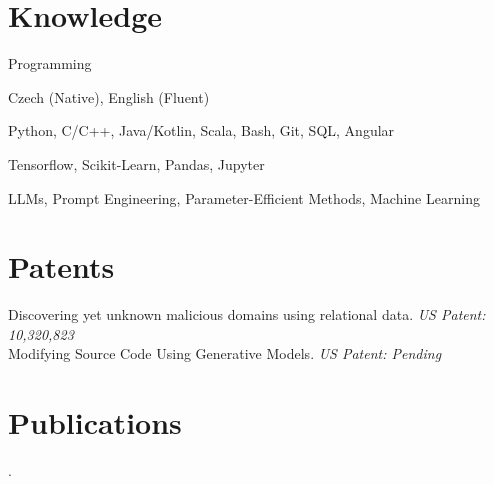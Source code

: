 \documentclass[10pt]{article}
\begin{document}
\section*{Knowledge}
\begin{labeling}{Programming}
	\setlength\itemsep{-0.15em}
    \item [\textbf{Languages}] Czech (Native), English (Fluent)
    \item [\textbf{Programming}] Python, C/C++, Java/Kotlin, Scala, Bash, Git, SQL, Angular
    \item [\textbf{Frameworks}] Tensorflow, Scikit-Learn, Pandas, Jupyter
    \item [\textbf{Skills}] LLMs, Prompt Engineering, Parameter-Efficient Methods, Machine Learning
\end{labeling}

\section*{Patents}
Discovering yet unknown malicious domains using relational data. {\it US Patent: 10,320,823}
\\
Modifying Source Code Using Generative Models. {\it US Patent: Pending}



\section*{Publications}
.

\vfill
\end{document}
